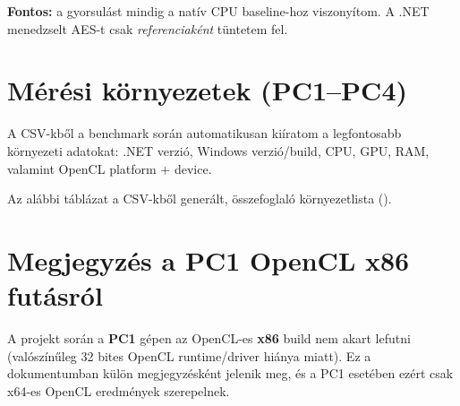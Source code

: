 \textbf{Fontos:} a gyorsulást mindig a natív CPU baseline-hoz viszonyítom.
A .NET menedzselt AES-t csak \emph{referenciaként} tüntetem fel.

\section{Mérési környezetek (PC1--PC4)}

A CSV-kből a benchmark során automatikusan kiíratom a legfontosabb környezeti adatokat:
.NET verzió, Windows verzió/build, CPU, GPU, RAM, valamint OpenCL platform + device.

Az alábbi táblázat a CSV-kből generált, összefoglaló környezetlista ().

\begin{table}[H]
  \centering
  \caption{A mérések fő környezeti jellemzői a CSV metaadatok alapján.}\label{tab:machines}
\end{table}

\section{Megjegyzés a PC1 OpenCL x86 futásról}

A projekt során a \textbf{PC1} gépen az OpenCL-es \textbf{x86} build nem akart lefutni
(valószínűleg 32 bites OpenCL runtime/driver hiánya miatt).
Ez a dokumentumban külön megjegyzésként jelenik meg, és a PC1 esetében ezért csak x64-es OpenCL eredmények szerepelnek.

\cleardoublepage
